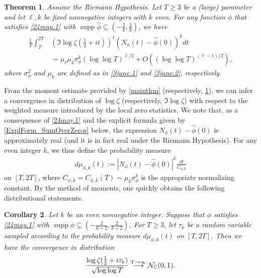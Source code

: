 \documentclass[12pt,oneside,english,a4paper]{amsart}
\newtheorem{thm}{Theorem}[section]
\newtheorem{cor}[thm]{Corollary}
\theoremstyle{remark}
\numberwithin{equation}{section}
\newcommand{\supp}{\operatorname{supp}}
\begin{document}
\begin{thm}\label{mainthm2}
    Assume the Riemann Hypothesis. Let $T \ge 3$ be a (large) parameter and let $\ell,k$ be fixed nonnegative integers with $k$ even. 
    For any function $\phi$ that satisfies \eqref{24may.1} with $\supp \hat\phi \subseteq (-\frac{2}{k},\frac{2}{k})$, we have
    \begin{equation}\begin{split}\label{3june.5}
        \frac{1}{T} \int_T^{2T} & \left(\Im\log\zeta(\tfrac{1}{2}+it) \right)^\ell \left(N_\phi(t)-\hat\phi(0)\right)^k dt \\
        &= \mu_\ell \mu_k \sigma_\phi^k \left(\log\log T\right)^{\ell/2} + O \left( (\log\log T)^{(\ell -1)/2} \right),
    \end{split}\end{equation} 
    where $\sigma_\phi^2$ and $\mu_k$ are defined as in \eqref{3june.1} and \eqref{3june.2}, respectively.
\end{thm}

From the moment estimate provided by \cref{mainthm} (respectively, \cref{mainthm2}), we can infer a convergence in distribution of $\log \zeta$ (respectively, $\Im \log \zeta$) with respect to the weighted measure introduced by the local zero statistics. We note that, as a consequence of \eqref{24may.1} and the explicit formula given by \cref{ExplForm_SumOverZeros} below, the expression $N_\phi(t) - \hat \phi(0)$ is approximately real (and it is in fact real under the Riemann Hypothesis). For any even integer $k$, we thus define the probability measure
\begin{align}\label{3june.4}
d\mu_{\phi,k}(t) := | N_\phi(t)-\hat\phi(0)|^{k} \frac{dt}{C_{\phi,k}}
\end{align}
on $[T,2 T]$, where $C_{\phi,k} = C_{\phi,k}(T) \sim \mu_k \sigma_\phi^k$ is the appropriate normalizing constant. By the method of moments, one quickly obtains the following distributional statements.

\begin{cor}\label{cor1}
Let $k$ be an even nonnegative integer. Suppose that $\phi$ satisfies \eqref{24may.1} with $\supp \hat\phi \subseteq (-\frac{2}{k+2},\frac{2}{k+2})$. For $T \ge 3$, let $\tau_k$ be a random variable sampled according to the probability measure $d\mu_{\phi,k}(t)$ on $[T,2 T]$. Then we have the convergence in distribution
\begin{equation}\label{10june.1}\notag
    \frac{\log \zeta ( \tfrac12 + i \tau_k)}{\sqrt{\log \log T}} \overset{T \to \infty}{\longrightarrow} \mathcal{N}_{\mathbb{C}}(0,1).
\end{equation}
\end{cor}
\end{document}
